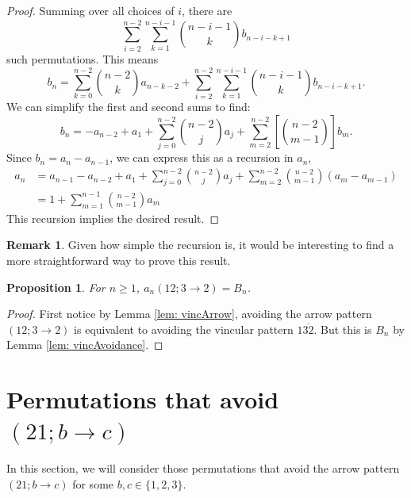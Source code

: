 \documentclass[11pt]{article}
\newtheorem{proposition}[theorem]{Proposition}
\theoremstyle{definition}
\newtheorem{remark}[theorem]{Remark}
\begin{document}
\begin{proof}
    Summing over all choices of $i$, there are
    \[
    \sum_{i=2}^{n-2} \sum_{k=1}^{n-i-1} \binom{n-i-1}{k} b_{n-i-k+1}
    \]
    such permutations. This means
    \[
    b_n = \sum_{k=0}^{n-2} \binom{n-2}{k} a_{n-k-2} + \sum_{i=2}^{n-2} \sum_{k=1}^{n-i-1} \binom{n-i-1}{k} b_{n-i-k+1}.
    \]
    We can simplify the first and second sums to find:
    \[
    b_n = -a_{n-2} + a_1 + \sum_{j=0}^{n-2} \binom{n-2}{j} a_{j} + \sum_{m=2}^{n-2} \left[\binom{n-2}{m-1}\right]b_m.
    \]
    Since $b_n = a_n - a_{n-1}$, we can express this as a recursion in $a_n$,
    \begin{align*}
    a_n &= a_{n-1} - a_{n-2} + a_1 + \sum_{j=0}^{n-2} \binom{n-2}{j} a_j + \sum_{m=2}^{n-2} \binom{n-2}{m-1}(a_m - a_{m-1})\\
    &= 1 + \sum_{m=1}^{n-1} \binom{n-2}{m-1} a_m
    \end{align*}
    This recursion implies the desired result.
\end{proof}

\begin{remark}
    Given how simple the recursion is, it would be interesting to find a more straightforward way to prove this result.
\end{remark}

\begin{proposition} \label{prop:12t32}
    For $n\geq 1$, $a_n(12; 3 \to 2) = B_n$.
\end{proposition}

\begin{proof}
    First notice by Lemma \ref{lem: vincArrow}, avoiding the arrow pattern $(12; 3 \to 2)$ is equivalent to avoiding the vincular pattern $1 \overline{32}$. But this is $B_n$ by Lemma \ref{lem: vincAvoidance}.
\end{proof}

\section{Permutations that avoid $(21;b\to c)$}\label{sec:21tbc}

In this section, we will consider those permutations that avoid the arrow pattern $(21; b\to c)$ for some $b,c\in\{1,2,3\}.$
\end{document}
